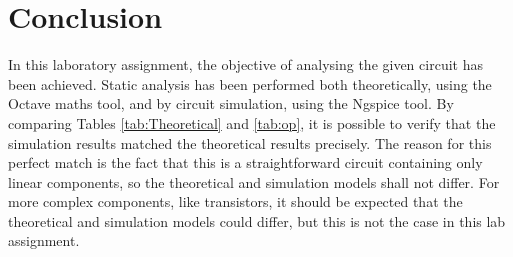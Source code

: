 \section{Conclusion}
\label{sec:conclusion}

In this laboratory assignment, the objective of analysing the given circuit has been achieved. Static analysis has been performed both theoretically, using the Octave maths tool, and by circuit simulation, using the Ngspice tool. By comparing Tables \ref{tab:Theoretical} and \ref{tab:op}, it is possible to verify that the simulation results matched the theoretical results precisely. The reason for this perfect match is the fact that this is a straightforward circuit containing only linear components, so the theoretical and simulation models shall not differ. For more complex components, like transistors, it should be expected that the theoretical and simulation models could differ, but this is not the case in this lab assignment.
